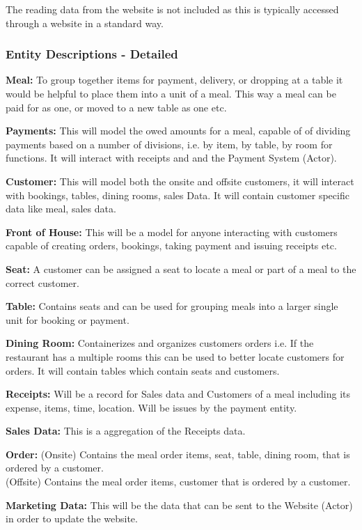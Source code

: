 \documentclass{article}
\begin{document}
The reading data from the website is not included as this is typically accessed through a website in a standard way.

\subsubsection{Entity Descriptions - Detailed}
\textbf{Meal:} To group together items for payment, delivery, or dropping at a table it would be helpful to place them into a unit of a meal. This way a meal can be paid for as one, or moved to a new table as one etc.

\textbf{Payments:} This will model the owed amounts for a meal, capable of of dividing payments based on a number of divisions, i.e. by item, by table, by room for functions. It will interact with receipts and and the Payment System (Actor).

\textbf{Customer:} This will model both the onsite and offsite customers, it will interact with bookings, tables, dining rooms, sales Data. It will contain customer specific data like meal, sales data.

\textbf{Front of House:} This will be a model for anyone interacting with customers capable of creating orders, bookings, taking payment and issuing receipts etc.

\textbf{Seat:} A customer can be assigned a seat to locate a meal or part of a meal to the correct customer.

\textbf{Table:} Contains seats and can be used for grouping meals into a larger single unit for booking or payment.

\textbf{Dining Room:} Containerizes and organizes customers orders i.e. If the restaurant has a multiple rooms this can be used to better locate customers for orders. It will contain tables which contain seats and customers.

\textbf{Receipts:} Will be a record for Sales data and Customers of a meal including its expense, items, time, location. Will be issues by the payment entity.

\textbf{Sales Data:} This is a aggregation of the Receipts data.

\textbf{Order:} (Onsite) Contains the meal order items, seat, table, dining room, that is ordered by a customer. \\(Offsite) Contains the meal order items, customer that is ordered by a customer.

\textbf{Marketing Data:} This will be the data that can be sent to the Website (Actor) in order to update the website.
\end{document}
